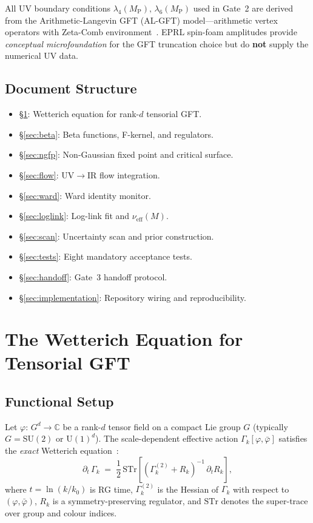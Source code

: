 \documentclass[11pt,a4paper]{article}
\theoremstyle{definition}
\theoremstyle{plain}
\theoremstyle{remark}
\newcommand{\MP}{M_{\mathrm{P}}}
\newcommand{\nueff}{\nu_{\mathrm{eff}}}
\newcommand{\Rk}{R_k}
\newcommand{\Gk}{\Gamma_k}
\begin{document}
\begin{provenance}
All UV boundary conditions $\lambda_4(\MP),\,\lambda_6(\MP)$ used in
Gate~2 are derived from the Arithmetic-Langevin GFT (AL-GFT)
model---arithmetic vertex operators with Zeta-Comb
environment~\cite{algft_gate1}.  EPRL spin-foam amplitudes provide
\emph{conceptual microfoundation} for the GFT truncation choice but do
\textbf{not} supply the numerical UV data.
\end{provenance}

\subsection{Document Structure}

\begin{itemize}[nosep]
  \item \S\ref{sec:wetterich}: Wetterich equation for rank-$d$ tensorial GFT.
  \item \S\ref{sec:beta}: Beta functions, F-kernel, and regulators.
  \item \S\ref{sec:ngfp}: Non-Gaussian fixed point and critical surface.
  \item \S\ref{sec:flow}: UV$\to$IR flow integration.
  \item \S\ref{sec:ward}: Ward identity monitor.
  \item \S\ref{sec:loglink}: Log-link fit and $\nueff(M)$.
  \item \S\ref{sec:scan}: Uncertainty scan and prior construction.
  \item \S\ref{sec:tests}: Eight mandatory acceptance tests.
  \item \S\ref{sec:handoff}: Gate~3 handoff protocol.
  \item \S\ref{sec:implementation}: Repository wiring and reproducibility.
\end{itemize}


\section{The Wetterich Equation for Tensorial GFT}
\label{sec:wetterich}

\subsection{Functional Setup}

Let $\varphi:\,G^d\to\mathbb{C}$ be a rank-$d$ tensor field on a compact
Lie group $G$ (typically $G=\mathrm{SU}(2)$ or $\mathrm{U}(1)^d$).
The scale-dependent effective action $\Gk[\varphi,\bar\varphi]$ satisfies
the \emph{exact} Wetterich equation~\cite{wetterich1993,carrozza2016}:
\begin{equation}
  \partial_t\,\Gk
  \;=\;
  \frac{1}{2}\,\mathrm{STr}\!\left[
    \left(\Gk^{(2)} + \Rk\right)^{-1}\,\partial_t\Rk
  \right],
  \label{eq:wetterich}
\end{equation}
where $t=\ln(k/k_0)$ is RG time, $\Gk^{(2)}$ is the Hessian of $\Gk$
with respect to $(\varphi,\bar\varphi)$, $\Rk$ is a
symmetry-preserving regulator, and $\mathrm{STr}$ denotes the
super-trace over group and colour indices.
\end{document}

